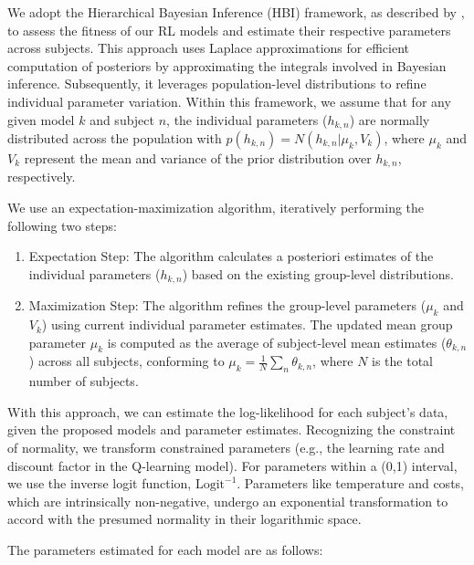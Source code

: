 \documentclass[
  number,
  preprint,
  3p,
  onecolumn]{elsarticle}
\providecommand{\tightlist}{%
  \setlength{\itemsep}{0pt}\setlength{\parskip}{0pt}}\usepackage{longtable,booktabs,array}
\begin{document}
We adopt the Hierarchical Bayesian Inference (HBI) framework, as
described by \citep{piray2019a}, to assess the fitness of our RL models
and estimate their respective parameters across subjects. This approach
uses Laplace approximations for efficient computation of posteriors by
approximating the integrals involved in Bayesian inference.
Subsequently, it leverages population-level distributions to refine
individual parameter variation. Within this framework, we assume that
for any given model \(k\) and subject \(n\), the individual parameters
(\(h_{k,n}\)) are normally distributed across the population with
\(p(h_{k,n}) = N(h_{k,n} | \mu_k, V_k)\), where \(\mu_k\) and \(V_k\)
represent the mean and variance of the prior distribution over
\(h_{k,n}\), respectively.

We use an expectation-maximization algorithm, iteratively performing the
following two steps:

\begin{enumerate}
\def\labelenumi{\arabic{enumi}.}
\tightlist
\item
  Expectation Step: The algorithm calculates a posteriori estimates of
  the individual parameters (\(h_{k,n}\)) based on the existing
  group-level distributions.
\item
  Maximization Step: The algorithm refines the group-level parameters
  (\(\mu_k\) and \(V_k\)) using current individual parameter estimates.
  The updated mean group parameter \(\mu_k\) is computed as the average
  of subject-level mean estimates (\(\theta_{k,n}\)) across all
  subjects, conforming to \(\mu_k = \frac{1}{N}\sum_{n}\theta_{k,n}\),
  where \(N\) is the total number of subjects.
\end{enumerate}

With this approach, we can estimate the log-likelihood for each
subject's data, given the proposed models and parameter estimates.
Recognizing the constraint of normality, we transform constrained
parameters (e.g., the learning rate and discount factor in the
Q-learning model). For parameters within a (0,1) interval, we use the
inverse logit function, \(\text{Logit}^{-1}\). Parameters like
temperature and costs, which are intrinsically non-negative, undergo an
exponential transformation to accord with the presumed normality in
their logarithmic space.

The parameters estimated for each model are as follows:
\end{document}
